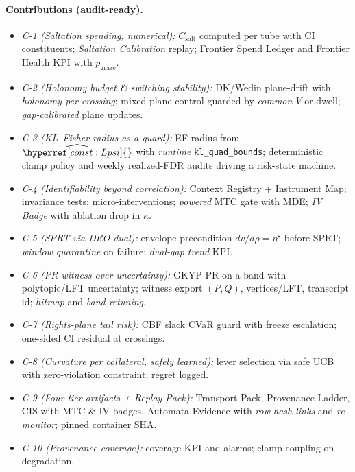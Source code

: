 \documentclass[10pt]{article}
\newcommand{\constref}[1]{\hyperref[const:#1]{\ensuremath{\csname constsym#1\endcsname}}}
\begin{document}
\paragraph{Contributions (audit-ready).}
\begin{itemize}[leftmargin=*,itemsep=2pt]
\item \emph{C-1 (Saltation spending, numerical):} $C_{\mathrm{salt}}$ computed per tube with CI constituents; \emph{Saltation Calibration} replay; Frontier Spend Ledger and Frontier Health KPI with $p_{\mathrm{graze}}$.
\item \emph{C-2 (Holonomy budget \& switching stability):} DK/Wedin plane-drift with \emph{holonomy per crossing}; mixed-plane control guarded by \emph{common-$V$} or dwell; \emph{gap-calibrated} plane updates.
\item \emph{C-3 (KL--Fisher radius as a guard):} EF radius from $\widehat{\constref{Lpsi}}$ with \emph{runtime} \texttt{kl\_quad\_bounds}; deterministic clamp policy and weekly realized-FDR audits driving a risk-state machine.
\item \emph{C-4 (Identifiability beyond correlation):} Context Registry + Instrument Map; invariance tests; micro-interventions; \emph{powered} MTC gate with MDE; \emph{IV Badge} with ablation drop in $\kappa$.
\item \emph{C-5 (SPRT via DRO dual):} envelope precondition $dv/d\rho=\eta^\star$ before SPRT; \emph{window quarantine} on failure; \emph{dual-gap trend} KPI.
\item \emph{C-6 (PR witness over uncertainty):} GKYP PR on a band with polytopic/LFT uncertainty; witness export $(P,Q)$, vertices/LFT, transcript id; \emph{hitmap} and \emph{band retuning}.
\item \emph{C-7 (Rights-plane tail risk):} CBF slack CVaR guard with freeze escalation; one-sided CI residual at crossings.
\item \emph{C-8 (Curvature per collateral, safely learned):} lever selection via safe UCB with zero-violation constraint; regret logged.
\item \emph{C-9 (Four-tier artifacts + Replay Pack):} Transport Pack, Provenance Ladder, CIS with MTC \& IV badges, Automata Evidence with \emph{row-hash links} and \emph{re-monitor}; pinned container SHA.
\item \emph{C-10 (Provenance coverage):} coverage KPI and alarms; clamp coupling on degradation.
\end{itemize}
\end{document}
